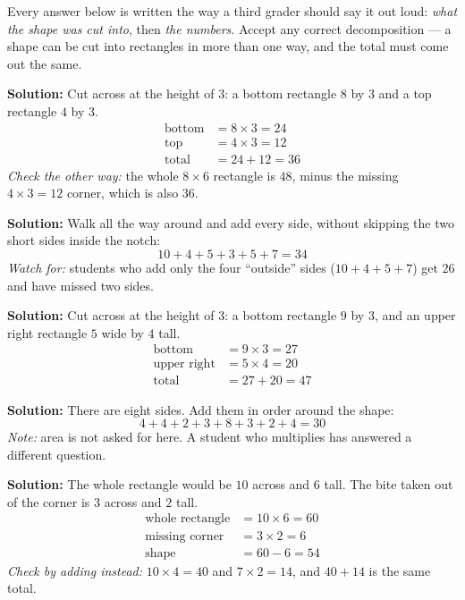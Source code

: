 \documentclass[12pt]{article}
\begin{document}


\noindent\small Every answer below is written the way a third grader should say it out loud:
\emph{what the shape was cut into}, then \emph{the numbers}. Accept any correct decomposition ---
a shape can be cut into rectangles in more than one way, and the total must come out the same.
\normalsize

\textbf{Solution:} Cut across at the height of $3$: a bottom rectangle $8$ by $3$ and a top
rectangle $4$ by $3$.
\begin{align*}
\text{bottom} &= 8 \times 3 = 24 \\
\text{top} &= 4 \times 3 = 12 \\
\text{total} &= 24 + 12 = 36
\end{align*}
\emph{Check the other way:} the whole $8 \times 6$ rectangle is $48$, minus the missing
$4 \times 3 = 12$ corner, which is also $36$.

\textbf{Solution:} Walk all the way around and add every side, without skipping the two short
sides inside the notch:
\[ 10 + 4 + 5 + 3 + 5 + 7 = 34 \]
\emph{Watch for:} students who add only the four ``outside'' sides ($10+4+5+7$) get $26$ and have
missed two sides.

\textbf{Solution:} Cut across at the height of $3$: a bottom rectangle $9$ by $3$, and an upper
right rectangle $5$ wide by $4$ tall.
\begin{align*}
\text{bottom} &= 9 \times 3 = 27 \\
\text{upper right} &= 5 \times 4 = 20 \\
\text{total} &= 27 + 20 = 47
\end{align*}

\textbf{Solution:} There are eight sides. Add them in order around the shape:
\[ 4 + 4 + 2 + 3 + 8 + 3 + 2 + 4 = 30 \]
\emph{Note:} area is not asked for here. A student who multiplies has answered a different question.

\textbf{Solution:} The whole rectangle would be $10$ across and $6$ tall. The bite taken out of the
corner is $3$ across and $2$ tall.
\begin{align*}
\text{whole rectangle} &= 10 \times 6 = 60 \\
\text{missing corner} &= 3 \times 2 = 6 \\
\text{shape} &= 60 - 6 = 54
\end{align*}
\emph{Check by adding instead:} $10 \times 4 = 40$ and $7 \times 2 = 14$, and $40 + 14$ is the same
total.
\end{document}
